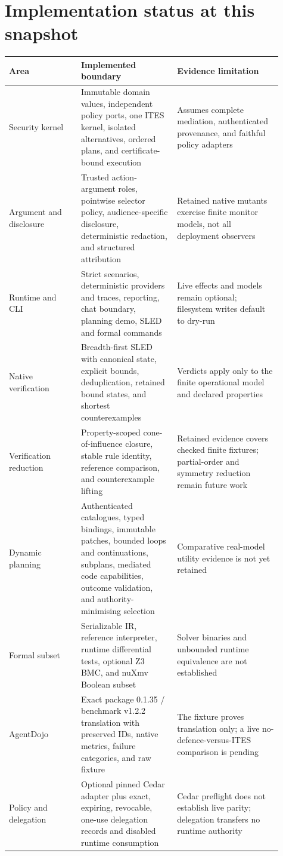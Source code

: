 \documentclass[11pt]{article}
\begin{document}
\section{Implementation status at this snapshot}

\begin{tabular}{p{0.24\linewidth}p{0.32\linewidth}p{0.35\linewidth}}
\toprule
Area & Implemented boundary & Evidence limitation \\
\midrule
Security kernel & Immutable domain values, independent policy ports, one ITES
kernel, isolated alternatives, ordered plans, and certificate-bound execution
& Assumes complete mediation, authenticated provenance, and faithful policy
adapters \\
Argument and disclosure & Trusted action-argument roles, pointwise selector
policy, audience-specific disclosure, deterministic redaction, and structured
attribution & Retained native mutants exercise finite monitor models, not all
deployment observers \\
Runtime and CLI & Strict scenarios, deterministic providers and traces,
reporting, chat boundary, planning demo, SLED and formal commands & Live
effects and models remain optional; filesystem writes default to dry-run \\
Native verification & Breadth-first SLED with canonical state, explicit bounds,
deduplication, retained bound states, and shortest counterexamples & Verdicts
apply only to the finite operational model and declared properties \\
Verification reduction & Property-scoped cone-of-influence closure, stable rule
identity, reference comparison, and counterexample lifting & Retained evidence
covers checked finite fixtures; partial-order and symmetry reduction remain
future work \\
Dynamic planning & Authenticated catalogues, typed bindings, immutable patches,
bounded loops and continuations, subplans, mediated code capabilities, outcome
validation, and authority-minimising selection & Comparative real-model utility
evidence is not yet retained \\
Formal subset & Serializable IR, reference interpreter, runtime differential
tests, optional Z3 BMC, and nuXmv Boolean subset & Solver binaries and unbounded
runtime equivalence are not established \\
AgentDojo & Exact package 0.1.35 / benchmark v1.2.2 translation with preserved
IDs, native metrics, failure categories, and raw fixture & The fixture proves
translation only; a live no-defence-versus-ITES comparison is pending \\
Policy and delegation & Optional pinned Cedar adapter plus exact, expiring,
revocable, one-use delegation records and disabled runtime consumption & Cedar
preflight does not establish live parity; delegation transfers no runtime
authority \\
\bottomrule
\end{tabular}
\end{document}
